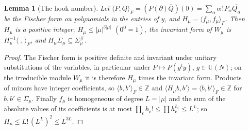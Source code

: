 \documentclass[10pt]{amsart}
\newtheorem{lemma}[theorem]{Lemma}
\theoremstyle{definition}
\theoremstyle{remark}
\newcommand{\Z}{\mathbb Z}
\providecommand{\auU}{\mathrm U}
\providecommand{\aubar}[1]{\overline{#1}}
\begin{document}
\begin{lemma}[The hook number]\label{pk:hook}
Let $\langle P,Q\rangle_F=(P(\partial)\aubar Q)(0)=\sum_\alpha\alpha!\,P_\alpha\aubar{Q_\alpha}$ be the
Fischer form on polynomials in the entries of $y$, and $H_\mu=\langle f_\mu,f_\mu\rangle_F$. Then
$H_\mu$ is a positive integer, $H_\mu\le|\mu|^{3|\mu|}$ $(0^0=1)$, the invariant form of $W_\mu$ is
$H_\mu^{-1}\langle\ ,\,\rangle_F$, and $H_\mu\Sigma_\mu\subseteq\Sigma_\mu^\#$.
\end{lemma}
\begin{proof}
The Fischer form is positive definite and invariant under unitary substitutions of the variables,
in particular under $P\mapsto P(g^ty)$, $g\in\auU(N)$; on the irreducible module $W_\mu$ it is
therefore $H_\mu$ times the invariant form. Products of minors have integer coefficients, so
$\langle b,b'\rangle_F\in\Z$ and $\langle H_\mu b,b'\rangle=\langle b,b'\rangle_F\in\Z$ for
$b,b'\in\Sigma_\mu$. Finally $f_\mu$ is homogeneous of degree $L=|\mu|$ and the sum of the absolute
values of its coefficients is at most $\prod_{\mathfrak c}h_{\mathfrak c}!\le\prod h_{\mathfrak
c}^{h_{\mathfrak c}}\le L^L$; so $H_\mu\le L!\,(L^L)^2\le L^{3L}$.
\end{proof}
\end{document}
